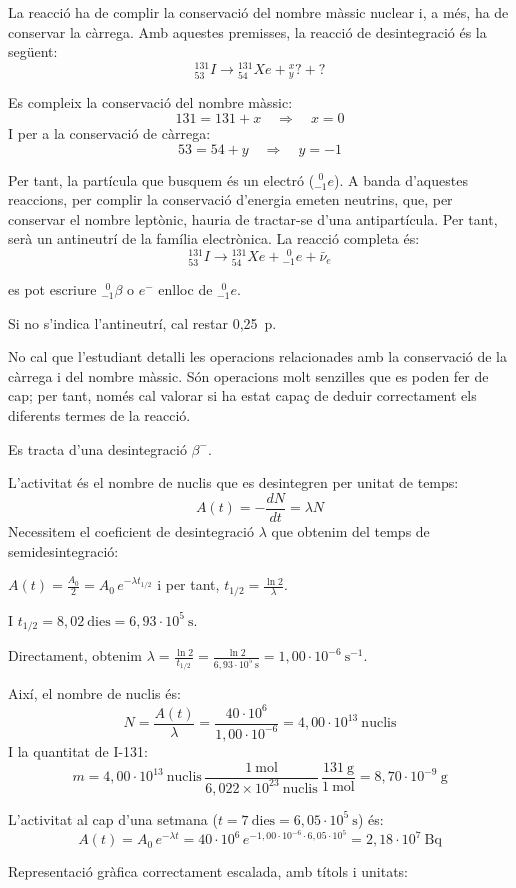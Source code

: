 \begin{solapartat}
 La reacció ha de complir la conservació del nombre màssic nuclear i, a més, ha de conservar la càrrega. Amb aquestes premisses, la reacció de desintegració és la següent:
\[ {}^{131}_{53}I \longrightarrow {}^{131}_{54}Xe + {}^{x}_{y}? + ? \]

Es compleix la conservació del nombre màssic:
\[ 131 = 131 + x \quad\Rightarrow\quad x = 0 \]
I per a la conservació de càrrega:
\[ 53 = 54 + y \quad\Rightarrow\quad y = -1 \]

Per tant, la partícula que busquem és un electró (${}^{\;\,0}_{-1}e$). A banda d'aquestes reaccions, per complir la conservació d'energia emeten neutrins, que, per conservar el nombre leptònic, hauria de tractar-se d'una antipartícula. Per tant, serà un antineutrí de la família electrònica. La reacció completa és:
\[ {}^{131}_{53}I \longrightarrow {}^{131}_{54}Xe + {}^{\;\,0}_{-1}e + \bar{\nu}_e \]

 es pot escriure ${}^{\;\,0}_{-1}\beta$ o $e^-$ enlloc de ${}^{\;\,0}_{-1}e$.

Si no s'indica l'antineutrí, cal restar 0,25~p.

No cal que l'estudiant detalli les operacions relacionades amb la conservació de la càrrega i del nombre màssic. Són operacions molt senzilles que es poden fer de cap; per tant, només cal valorar si ha estat capaç de deduir correctament els diferents termes de la reacció.

 Es tracta d'una desintegració $\beta^-$.
\end{solapartat}

\begin{solapartat}
 L'activitat és el nombre de nuclis que es desintegren per unitat de temps:
\[ A(t) = -\frac{dN}{dt} = \lambda N \]
Necessitem el coeficient de desintegració $\lambda$ que obtenim del temps de semidesintegració:

$A(t) = \frac{A_0}{2} = A_0\,e^{-\lambda t_{1/2}}$ i per tant, $t_{1/2} = \frac{\ln 2}{\lambda}$.

I $t_{1/2} = 8,02\ \text{dies} = 6,93\cdot 10^{5}\ \mathrm{s}$.

Directament, obtenim $\lambda = \frac{\ln 2}{t_{1/2}} = \frac{\ln 2}{6,93\cdot 10^{5}\ \mathrm{s}} = 1,00\cdot 10^{-6}\ \mathrm{s^{-1}}$.

Així, el nombre de nuclis és:
\[ N = \frac{A(t)}{\lambda} = \frac{40\cdot 10^{6}}{1,00\cdot 10^{-6}} = 4,00\cdot 10^{13}\ \text{nuclis} \]
I la quantitat de I-131:
\[ m = 4,00\cdot 10^{13}\ \text{nuclis}\,\frac{1\ \text{mol}}{6,022\times 10^{23}\ \text{nuclis}}\,\frac{131\ \mathrm{g}}{1\ \text{mol}} = 8,70\cdot 10^{-9}\ \mathrm{g} \]

 L'activitat al cap d'una setmana ($t = 7\ \text{dies} = 6,05\cdot 10^{5}\ \mathrm{s}$) és:
\[ A(t) = A_0\,e^{-\lambda t} = 40\cdot 10^{6}\,e^{-1,00\cdot 10^{-6}\cdot 6,05\cdot 10^{5}} = 2,18\cdot 10^{7}\ \mathrm{Bq} \]

 Representació gràfica correctament escalada, amb títols i unitats:
\end{solapartat}
